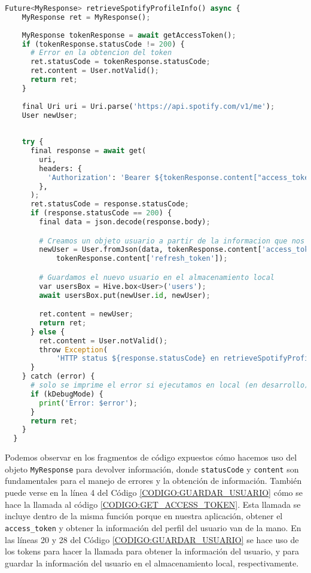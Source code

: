 \begin{lstlisting}[language=python, caption=Guardar información del usuario, label=CODIGO:GUARDAR_USUARIO]
  Future<MyResponse> retrieveSpotifyProfileInfo() async {
    MyResponse ret = MyResponse();
    
    MyResponse tokenResponse = await getAccessToken();
    if (tokenResponse.statusCode != 200) {
      # Error en la obtencion del token
      ret.statusCode = tokenResponse.statusCode;
      ret.content = User.notValid();
      return ret;
    }
  
    final Uri uri = Uri.parse('https://api.spotify.com/v1/me');
    User newUser;
  
    
    try {
      final response = await get(
        uri,
        headers: {
          'Authorization': 'Bearer ${tokenResponse.content["access_token"]}'
        },
      );
      ret.statusCode = response.statusCode;
      if (response.statusCode == 200) {
        final data = json.decode(response.body);

        # Creamos un objeto usuario a partir de la informacion que nos devuelve Spotify 
        newUser = User.fromJson(data, tokenResponse.content['access_token'],
            tokenResponse.content['refresh_token']);

        # Guardamos el nuevo usuario en el almacenamiento local
        var usersBox = Hive.box<User>('users');
        await usersBox.put(newUser.id, newUser);

        ret.content = newUser;
        return ret;
      } else {
        ret.content = User.notValid();
        throw Exception(
            'HTTP status ${response.statusCode} en retrieveSpotifyProfileInfo');
      }
    } catch (error) {
      # solo se imprime el error si ejecutamos en local (en desarrollo)
      if (kDebugMode) {
        print('Error: $error');
      }
      return ret;
    }
  }
\end{lstlisting}

Podemos observar en los fragmentos de código expuestos cómo hacemos uso del objeto \texttt{MyResponse} para devolver información, donde \texttt{statusCode}
y \texttt{content} son fundamentales para el manejo de errores y la obtención de información. También puede verse en la línea 4 del Código \ref{CODIGO:GUARDAR_USUARIO}
cómo se hace la llamada al código \ref{CODIGO:GET_ACCESS_TOKEN}. Esta llamada se incluye dentro de la misma función porque en nuestra aplicación, obtener el 
\texttt{access\_token} y obtener la información del perfil del usuario van de la mano. En las líneas 20 y 28 del Código \ref{CODIGO:GUARDAR_USUARIO} se hace uso 
de los tokens para hacer la llamada para obtener la información del usuario, y para guardar la información del usuario en el almacenamiento local, respectivamente.

